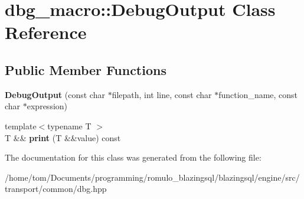\hypertarget{classdbg__macro_1_1DebugOutput}{}\section{dbg\+\_\+macro\+:\+:Debug\+Output Class Reference}
\label{classdbg__macro_1_1DebugOutput}
\subsection*{Public Member Functions}
\begin{DoxyCompactItemize}
\item 
\mbox{\label{classdbg__macro_1_1DebugOutput_a9f70b10a16e1fc63012aa25cea32973e}} 
{\bfseries Debug\+Output} (const char $\ast$filepath, int line, const char $\ast$function\+\_\+name, const char $\ast$expression)
\item 
\mbox{\label{classdbg__macro_1_1DebugOutput_a9614125a8b550e40c348c18cb660780b}} 
{\footnotesize template$<$typename T $>$ }\\T \&\& {\bfseries print} (T \&\&value) const
\end{DoxyCompactItemize}


The documentation for this class was generated from the following file\+:\begin{DoxyCompactItemize}
\item 
/home/tom/\+Documents/programming/romulo\+\_\+blazingsql/blazingsql/engine/src/transport/common/dbg.\+hpp\end{DoxyCompactItemize}
